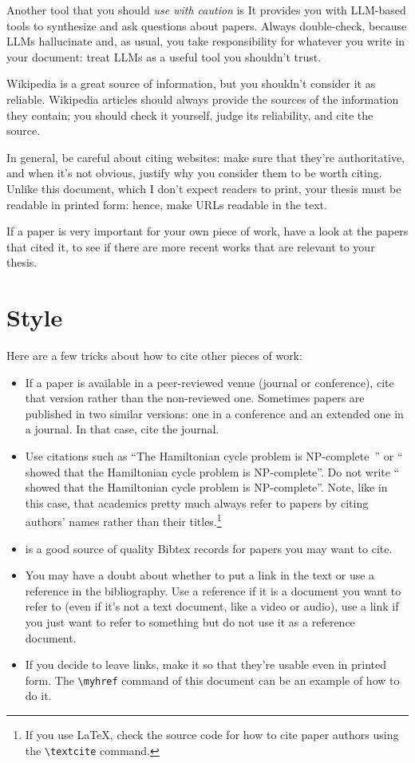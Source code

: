Another tool that you should \emph{use with caution} is  It provides you with \ac{LLM}-based tools to synthesize and ask questions about papers. Always double-check, because \acp{LLM} hallucinate and, as usual, you take responsibility for whatever you write in your document: treat \acp{LLM} as a useful tool you shouldn't trust.

Wikipedia is a great source of information, but you shouldn't consider it as reliable.
Wikipedia articles should always provide the sources of the information they contain; you
should check it yourself, judge its reliability, and cite the source.

In general, be careful about citing websites: make sure that they're authoritative, and when it's not obvious, justify why you consider them to be worth citing. Unlike this document, which I don't expect readers to print, your thesis must be readable in printed form: hence, make URLs readable in the text.

If a paper is very important for your own piece of work, have a look at the papers
that cited it, to see if there are more recent works that are relevant to your thesis.

\section{Style}

Here are a few tricks about how to cite other pieces of work:
\begin{itemize}
  \item If a paper is available in a peer-reviewed venue (journal or conference), cite that
  version rather than the non-reviewed one. Sometimes papers are published in two similar
  versions: one in a conference and an extended one in a journal. In that case, cite the
  journal.
  \item Use citations such as ``The Hamiltonian cycle problem is
  NP-complete~\cite{DBLP:conf/coco/Karp72}'' or ``\textcite{DBLP:conf/coco/Karp72} showed
  that the Hamiltonian cycle problem is NP-complete''. Do not write
  ``\cite{DBLP:conf/coco/Karp72} showed that the Hamiltonian cycle problem is NP-complete''. Note, like in this case, that academics pretty much always refer to papers by citing authors' names rather than their titles.\footnote{If you use \LaTeX, check the source code for how to cite paper authors using the \texttt{\textbackslash textcite} command.}
  \item {} is a good source of quality Bibtex records for papers
  you may want to cite.
  \item You may have a doubt about whether to put a link in the text or use a reference in the bibliography. Use a reference if it is a document you want to refer to (even if it's not a text document, like a video or audio), use a link if you just want to refer to something but do not use it as a reference document.
  \item If you decide to leave links, make it so that they're usable even in printed form. The \verb|\myhref| command of this document can be an example of how to do it.
\end{itemize}

